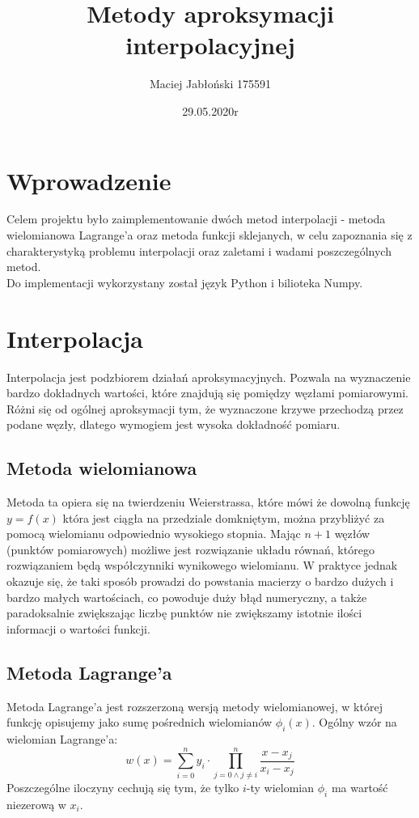 \documentclass{article} %
\title{Metody aproksymacji interpolacyjnej}
\date{29.05.2020r}
\author{Maciej Jabłoński 175591}
\begin{document}
\maketitle

\section{Wprowadzenie}

Celem projektu było zaimplementowanie dwóch metod interpolacji - metoda wielomianowa Lagrange'a oraz metoda funkcji sklejanych, w celu zapoznania się z charakterystyką problemu interpolacji oraz zaletami i wadami poszczególnych metod.\\
Do implementacji wykorzystany został język Python i bilioteka Numpy.

\section{Interpolacja}
Interpolacja jest podzbiorem działań aproksymacyjnych. Pozwala na wyznaczenie bardzo dokładnych wartości, które znajdują się pomiędzy węzłami pomiarowymi. Różni się od ogólnej aproksymacji tym, że wyznaczone krzywe przechodzą przez podane węzły, dlatego wymogiem jest wysoka dokładność pomiaru.

\subsection{Metoda wielomianowa}
Metoda ta opiera się na twierdzeniu Weierstrassa, które mówi że dowolną funkcję \(y=f(x)\) która jest ciągła na przedziale domkniętym, można przybliżyć za pomocą wielomianu odpowiednio wysokiego stopnia. Mając \(n+1\) węzłów (punktów pomiarowych) możliwe jest rozwiązanie układu równań, którego rozwiązaniem będą współczynniki wynikowego wielomianu. W praktyce jednak okazuje się, że taki sposób prowadzi do powstania macierzy o bardzo dużych i bardzo małych wartościach, co powoduje duży błąd numeryczny, a także paradoksalnie zwiększając liczbę punktów nie zwiększamy istotnie ilości informacji o wartości funkcji.

\subsection{Metoda Lagrange'a}
Metoda Lagrange'a jest rozszerzoną wersją metody wielomianowej, w której funkcję opisujemy jako sumę pośrednich wielomianów \(\phi_i(x)\). Ogólny wzór na wielomian Lagrange'a:
\begin{equation}
    w(x) = \sum\limits_{i=0}^{n} y_i \cdot\prod\limits_{j=0 \wedge j\ne i}^n \frac{x-x_j}{x_i - x_j}
\end{equation}
Poszczególne iloczyny cechują się tym, że tylko \(i\)-ty wielomian \(\phi_i\) ma wartość niezerową w \(x_i\).
\newpage
\end{document}
